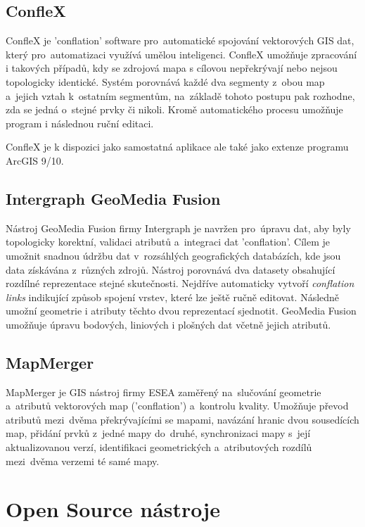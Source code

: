 \subsection{ConfleX}
\label{conflex}

ConfleX je 'conflation' software pro~automatické spojování vektorových GIS dat, který pro~automatizaci využívá umělou inteligenci. ConfleX umožňuje zpracování i takových 
případů, kdy se zdrojová mapa s cílovou nepřekrývají nebo nejsou topologicky identické. Systém porovnává každé dva segmenty z~obou map a~jejich vztah k~ostatním segmentům, 
na~základě tohoto postupu pak rozhodne, zda se jedná o~stejné prvky či nikoli. Kromě automatického procesu umožňuje program i následnou ruční editaci.

ConfleX je k dispozici jako samostatná aplikace ale také jako extenze programu ArcGIS 9/10.

\subsection{Intergraph GeoMedia Fusion}
\label{geomedia}

Nástroj GeoMedia Fusion firmy Intergraph je navržen pro~úpravu dat, aby byly topologicky korektní, validaci atributů a~integraci dat 'conflation'. Cílem je umožnit snadnou 
údržbu dat v~rozsáhlých geografických databázích, kde jsou data získávána z~různých zdrojů. Nástroj porovnává dva datasety obsahující rozdílné reprezentace stejné skutečnosti.
Nejdříve automaticky vytvoří \textit{conflation links} indikující způsob spojení vrstev, které lze ještě ručně editovat. Následně umožní geometrie i atributy těchto dvou 
reprezentací sjednotit. GeoMedia Fusion umožňuje úpravu bodových, liniových i plošných dat včetně jejich atributů.


\subsection{MapMerger}
\label{mapmerger}

MapMerger je GIS nástroj firmy ESEA zaměřený na~slučování geometrie a~atributů vektorových map ('conflation') a~kontrolu kvality. Umožňuje převod atributů 
mezi~dvěma překrývajícími se mapami, navázání hranic dvou sousedících map, přidání prvků z~jedné mapy do~druhé, synchronizaci mapy s~její aktualizovanou verzí, 
identifikaci geometrických a~atributových rozdílů mezi~dvěma verzemi té samé mapy. 

\section{Open Source nástroje}
\label{open-source}

